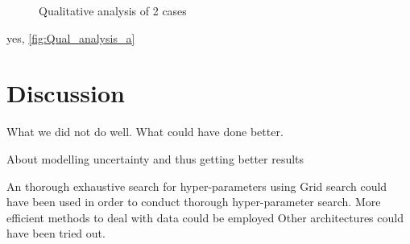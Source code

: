 \begin{figure}[ht]
    \centering
    \qquad
    \caption
    {Qualitative analysis of 2 cases
    }
    \label{fig:Qual_analysis}
\end{figure}

yes, \ref{fig:Qual_analysis_a}

\section{Discussion}

What we did not do well. 
What could have done better. 

About modelling uncertainty and thus getting better results

An thorough exhaustive search for hyper-parameters using Grid search could have been used in order to conduct thorough hyper-parameter search. 
More efficient methods to deal with data could be employed
Other architectures could have been tried out.

